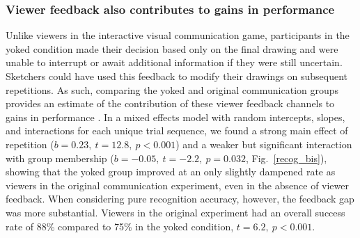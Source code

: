 \documentclass[10pt,letterpaper]{article}
\begin{document}

\vspace{2mm}

\subsubsection{Viewer feedback also contributes to gains in performance}

Unlike viewers in the interactive visual communication game, participants in the yoked condition made their decision based only on the final drawing and were unable to interrupt or await additional information if they were still uncertain.
Sketchers could have used this feedback to modify their drawings on subsequent repetitions.
As such, comparing the yoked and original communication groups provides an estimate of the contribution of these viewer feedback channels to gains in performance  \cite{schober_understanding_1989}.
In a mixed effects model with random intercepts, slopes, and interactions for each unique trial sequence, we found a %
strong main effect of repetition ($b = 0.23, ~t = 12.8,~p < 0.001$) and a weaker but significant interaction with group membership ($b = -0.05, ~t = -2.2, ~p = 0.032$, Fig.~\ref{recog_bis}), showing that the yoked group improved at an only slightly dampened rate as viewers in the original communication experiment, even in the absence of viewer feedback. %
When considering pure recognition accuracy, however, the feedback gap was more substantial.
Viewers in the original experiment had an overall success rate of 88\% compared to 75\% in the yoked condition, $t = 6.2, ~p < 0.001$. %
\end{document}
